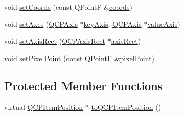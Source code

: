 \begin{DoxyCompactItemize}
\item 
void \hyperlink{classQCPItemPosition_acc70b3abc143287f806e5f154e5e07b0}{set\+Coords} (const Q\+PointF \&\hyperlink{classQCPItemPosition_a253d7adbb6d46299bd6cbc31aa8819f1}{coords})
\item 
void \hyperlink{classQCPItemPosition_a2185f45c75ac8cb9be89daeaaad50e37}{set\+Axes} (\hyperlink{classQCPAxis}{Q\+C\+P\+Axis} $\ast$\hyperlink{classQCPItemPosition_ab99de7ae5766d246defb2de9f47eaf51}{key\+Axis}, \hyperlink{classQCPAxis}{Q\+C\+P\+Axis} $\ast$\hyperlink{classQCPItemPosition_a8d3a039fb2e69df86b4015daa30dfd2d}{value\+Axis})
\item 
void \hyperlink{classQCPItemPosition_a0cd9b326fb324710169e92e8ca0041c2}{set\+Axis\+Rect} (\hyperlink{classQCPAxisRect}{Q\+C\+P\+Axis\+Rect} $\ast$\hyperlink{classQCPItemPosition_a7f10fa702a324880cc4de958f434cec7}{axis\+Rect})
\item 
void \hyperlink{classQCPItemPosition_ab404e56d9ac2ac2df0382c57933a71ef}{set\+Pixel\+Point} (const Q\+PointF \&\hyperlink{classQCPItemPosition_ae490f9c76ee2ba33752c495d3b6e8fb5}{pixel\+Point})
\end{DoxyCompactItemize}
\subsection*{Protected Member Functions}
\begin{DoxyCompactItemize}
\item 
virtual \hyperlink{classQCPItemPosition}{Q\+C\+P\+Item\+Position} $\ast$ \hyperlink{classQCPItemPosition_a577a7efc601df85a20b3e709d1ac320e}{to\+Q\+C\+P\+Item\+Position} ()
\end{DoxyCompactItemize}
